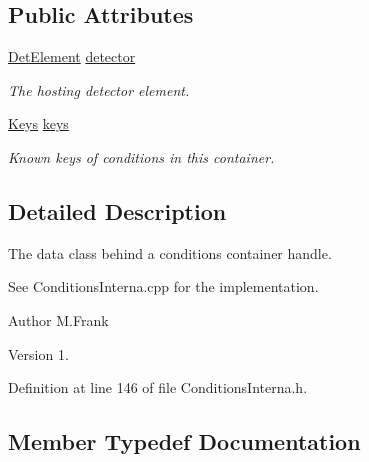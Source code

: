 \subsection*{Public Attributes}
\begin{DoxyCompactItemize}
\item 
\hyperlink{class_d_d4hep_1_1_geometry_1_1_det_element}{Det\+Element} \hyperlink{class_d_d4hep_1_1_conditions_1_1_interna_1_1_condition_container_aea33e2b2bf7d2ee4db38f87d2f231a2e}{detector}
\begin{DoxyCompactList}\small\item\em The hosting detector element. \end{DoxyCompactList}\item 
\hyperlink{class_d_d4hep_1_1_conditions_1_1_interna_1_1_condition_container_a01f9461850ee260a6c76646f9619c8bb}{Keys} \hyperlink{class_d_d4hep_1_1_conditions_1_1_interna_1_1_condition_container_a80876b929c712092fb1e036e1916f621}{keys}
\begin{DoxyCompactList}\small\item\em Known keys of conditions in this container. \end{DoxyCompactList}\end{DoxyCompactItemize}


\subsection{Detailed Description}
The data class behind a conditions container handle. 

See Conditions\+Interna.\+cpp for the implementation.

\begin{DoxyAuthor}{Author}
M.\+Frank 
\end{DoxyAuthor}
\begin{DoxyVersion}{Version}
1. 
\end{DoxyVersion}


Definition at line 146 of file Conditions\+Interna.\+h.



\subsection{Member Typedef Documentation}
\hypertarget{class_d_d4hep_1_1_conditions_1_1_interna_1_1_condition_container_aa697bd92da7a05031b5eef63bb9f000b}{}\label{class_d_d4hep_1_1_conditions_1_1_interna_1_1_condition_container_aa697bd92da7a05031b5eef63bb9f000b} 
